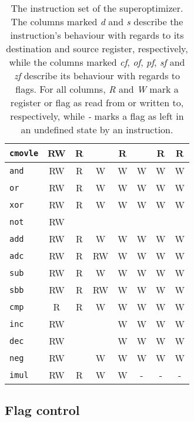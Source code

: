 \documentclass[a4paper,11pt]{kth-mag}
\begin{document}
\begin{table}
\begin{tabular}{l|cc|ccccc}
\verb|cmovle| & RW & R  &           & R         &           & R         & R         \\
\hline
\verb|and|    & RW & R  & W         & W         & W         & W         & W         \\
\verb|or|     & RW & R  & W         & W         & W         & W         & W         \\
\verb|xor|    & RW & R  & W         & W         & W         & W         & W         \\
\verb|not|    & RW &    &           &           &           &           &           \\
\hline
\verb|add|    & RW & R  & W         & W         & W         & W         & W         \\
\verb|adc|    & RW & R  & RW        & W         & W         & W         & W         \\
\verb|sub|    & RW & R  & W         & W         & W         & W         & W         \\
\verb|sbb|    & RW & R  & RW        & W         & W         & W         & W         \\
\verb|cmp|    & R  & R  & W         & W         & W         & W         & W         \\
\verb|inc|    & RW &    &           & W         & W         & W         & W         \\
\verb|dec|    & RW &    &           & W         & W         & W         & W         \\
\verb|neg|    & RW &    & W         & W         & W         & W         & W         \\
\hline
\verb|imul|   & RW & R  & W         & W         & -         & -         & -         \\
\end{tabular}
\caption{The instruction set of the superoptimizer.
The columns marked \emph{d} and \emph{s} describe the instruction's behaviour with regards to its destination and source register, respectively,
while the columns marked \emph{cf}, \emph{of}, \emph{pf}, \emph{sf} and \emph{zf} describe its behaviour with regards to flags.
For all columns, \emph{R} and \emph{W} mark a register or flag as read from or written to, respectively, while \emph{-} marks a flag as left in an undefined state by an instruction.} %
\label{tab:insns}
\end{table}

\subsection{Flag control}
\end{document}
